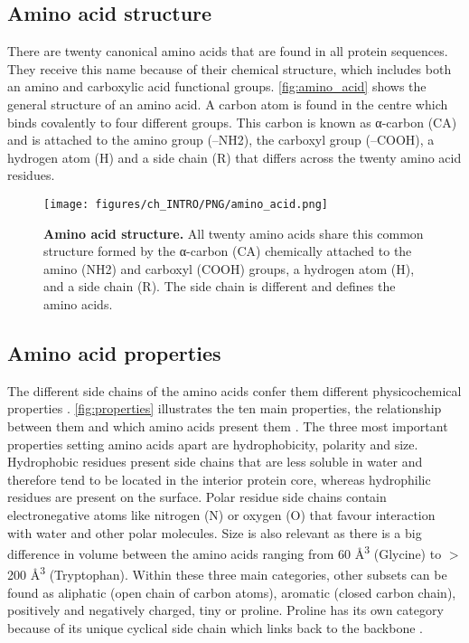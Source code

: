 \subsection{Amino acid structure}

There are twenty canonical amino acids that are found in all protein sequences. They receive this name because of their chemical structure, which includes both an amino and carboxylic acid functional groups. \autoref{fig:amino_acid} shows the general structure of an amino acid. A carbon atom is found in the centre which binds covalently to four different groups. This carbon is known as α-carbon (CA) and is attached to the amino group (--NH2), the carboxyl group (--COOH), a hydrogen atom (H) and a side chain (R) that differs across the twenty amino acid residues.

\begin{figure}[htbp!]
    \centering
    \texttt{[image: figures/ch\_INTRO/PNG/amino\_acid.png]}
    \caption[Amino acid structure]{\textbf{Amino acid structure.} All twenty amino acids share this common structure formed by the α-carbon (CA) chemically attached to the amino (NH2) and carboxyl (COOH) groups, a hydrogen atom (H), and a side chain (R). The side chain is different and defines the amino acids.}
    \label{fig:amino_acid}
\end{figure}

\subsection{Amino acid properties}

The different side chains of the amino acids confer them different physicochemical properties \cite{SNEATH_1966_PROPERTIES}. \autoref{fig:properties} illustrates the ten main properties, the relationship between them and which amino acids present them \cite{TAYLOR_1986_PROPERTIES}. The three most important properties setting amino acids apart are hydrophobicity, polarity and size. Hydrophobic residues present side chains that are less soluble in water and therefore tend to be located in the interior protein core, whereas hydrophilic residues are present on the surface. Polar residue side chains contain electronegative atoms like nitrogen (N) or oxygen (O) that favour interaction with water and other polar molecules. Size is also relevant as there is a big difference in volume between the amino acids ranging from 60 \AA{}\textsuperscript{3} (Glycine) to $>$200 \AA{}\textsuperscript{3} (Tryptophan). Within these three main categories, other subsets can be found as aliphatic (open chain of carbon atoms), aromatic (closed carbon chain), positively and negatively charged, tiny or proline. Proline has its own category because of its unique cyclical side chain which links back to the backbone \cite{ZVELEBIL_1987_PREDICTION}.

